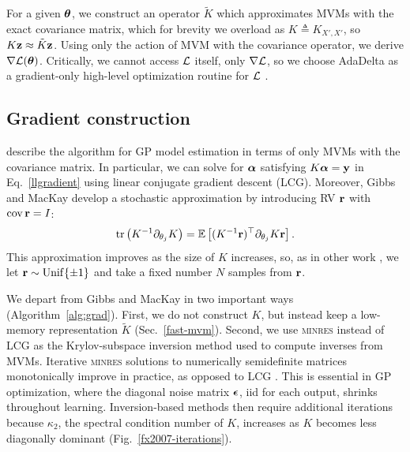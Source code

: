 \documentclass[twoside]{article}
\begin{document}
For a given ${\boldsymbol\theta}$, we construct an operator $\tilde{K}$ which approximates MVMs with the exact covariance matrix, which for brevity we overload as $K\triangleq K_{X',X'}$, so $K\textbf{z}\approx \tilde{K}\textbf{z}$. Using only the action of MVM with the covariance operator, we derive $\nabla\mathcal{L}({\boldsymbol\theta})$. Critically, we cannot access $\mathcal{L}$ itself, only $\nabla\mathcal{L}$, so we choose AdaDelta as a gradient-only high-level optimization routine for $\mathcal{L}$ \citep{zeiler2012adadelta}.


\subsection{Gradient construction}

\citet{gibbs1996cient} describe the algorithm for GP model estimation in terms of only MVMs with the covariance matrix. In particular, we can solve for ${\boldsymbol\alpha}$ satisfying $K{\boldsymbol\alpha}=\textbf{y}$ in Eq.~\ref{llgradient} using linear conjugate gradient descent (LCG). Moreover, Gibbs and MacKay develop a stochastic approximation by introducing RV ${\textbf{r}}$ with $\operatorname{cov} {\textbf{r}}=I$:
\begin{align}
  \operatorname{tr}\left({K^{-1}\partial_{\theta_j}K}\right) = \operatorname{\mathbb{E}}\left[(K^{-1}{\textbf{r}})^\top\partial_{\theta_j}K{\textbf{r}}\right]\label{eq:trace}.
\end{align}
This approximation improves as the size of $K$ increases, so, as in other work \citep{cutajar2016preconditioning}, we let ${\textbf{r}}\sim\operatorname{Unif}\{\pm 1\}$ and take a fixed number $N$ samples from ${\textbf{r}}$.

We depart from Gibbs and MacKay in two important ways (Algorithm~\ref{alg:grad}). First, we do not construct $K$, but instead keep a low-memory representation $\tilde{K}$ (Sec.~\ref{fast-mvm}). Second, we use \textsc{minres} instead of LCG as the Krylov-subspace inversion method used to compute inverses from MVMs. Iterative \textsc{minres} solutions to numerically semidefinite matrices monotonically improve in practice, as opposed to LCG \citep{fong2012cg}. This is essential in GP optimization, where the diagonal noise matrix ${\boldsymbol\epsilon}$, iid for each output, shrinks throughout learning. Inversion-based methods then require additional iterations because $\kappa_2$, the spectral condition number of $K$, increases as $K$ becomes less diagonally dominant (Fig.~\ref{fx2007-iterations}).
\end{document}

